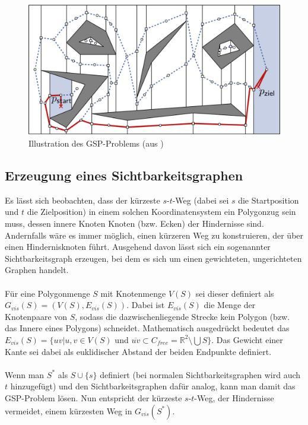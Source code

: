 \documentclass[a4paper, notitlepage, 12pt]{scrartcl}
\begin{document}
 \begin{figure}[H]
 	\centering \includegraphics[scale=0.35]{pics/gsp}
 	\caption{Illustration des GSP-Problems (aus \cite{Src:noem})}
 \end{figure}
 \subsection{Erzeugung eines Sichtbarkeitsgraphen}
 Es lässt sich beobachten, dass der kürzeste $s$-$t$-Weg (dabei sei $s$ die Startposition und $t$ die Zielposition) in einem solchen Koordinatensystem ein Polygonzug sein muss, dessen innere Knoten Knoten (bzw. Ecken) der Hindernisse sind. Andernfalls wäre es immer möglich, einen kürzeren Weg zu konstruieren, der über einen Hindernisknoten führt.\cite{Src:noem} Ausgehend davon lässt sich ein sogenannter Sichtbarkeitsgraph erzeugen, bei dem es sich um einen gewichteten, ungerichteten Graphen handelt. \\ \\
 Für eine Polygonmenge $S$ mit Knotenmenge $V(S)$ sei dieser definiert als $G_{vis}(S) = (V(S),E_{vis}(S))$. Dabei ist $E_{vis}(S)$ die Menge der Knotenpaare von $S$, sodass die dazwischenliegende Strecke kein Polygon (bzw. das Innere eines Polygons) schneidet. Mathematisch ausgedrückt bedeutet das $E_{vis}(S) = \{ uv | u,v \in V(S)$ und $\overline{uv} \subset C_{free} = \mathbb{R}^{2} \setminus \bigcup S \}$. Das Gewicht einer Kante sei dabei als euklidischer Abstand der beiden Endpunkte definiert. \\ \\
 Wenn man $S^{*}$ als $S \cup \{s\}$ definiert (bei normalen Sichtbarkeitsgraphen wird auch $t$ hinzugefügt) und den Sichtbarkeitsgraphen dafür analog, kann man damit das GSP-Problem lösen. Nun entspricht der kürzeste $s$-$t$-Weg, der Hindernisse vermeidet, einem kürzesten Weg in $G_{vis}(S^{*})$.
\end{document}
